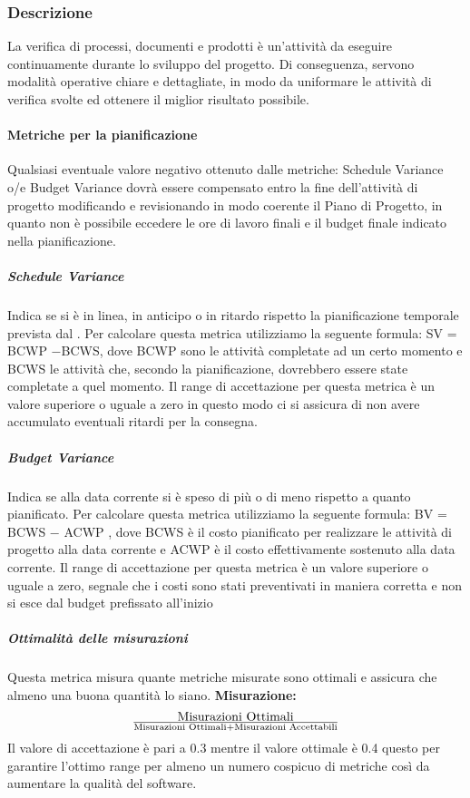 \subsubsection{Descrizione}

La verifica di processi, documenti e prodotti è un'attività da eseguire continuamente
durante lo sviluppo del progetto. Di conseguenza, servono modalità operative chiare
e dettagliate, in modo da uniformare le attività di verifica svolte ed ottenere il miglior
risultato possibile.

\paragraph{Metriche per la pianificazione}
Qualsiasi eventuale valore negativo ottenuto dalle  metriche: Schedule Variance o/e Budget Variance dovrà essere  compensato entro la fine dell'attività di progetto modificando e revisionando in modo coerente il Piano di Progetto, in quanto non è possibile eccedere le ore di lavoro finali e il budget finale indicato nella pianificazione.

\subparagraph{Schedule Variance}
Indica se si è in linea, in anticipo o in ritardo rispetto la pianificazione temporale prevista dal \pianodiprogetto.
Per calcolare questa metrica utilizziamo la seguente formula: SV = BCWP −BCWS, dove BCWP sono le attività completate ad un certo momento e BCWS
le attività che, secondo la pianificazione, dovrebbero essere state completate a quel momento.
Il range di accettazione per questa metrica è un valore superiore o uguale a zero in questo modo ci si assicura di non avere accumulato eventuali ritardi per la consegna.

\subparagraph{Budget Variance}
Indica se alla data corrente si è speso di più o di meno rispetto a quanto pianificato.
Per calcolare questa metrica utilizziamo la seguente formula: BV = BCWS − ACWP , dove BCWS è il costo pianificato per realizzare le attività di progetto
alla data corrente e ACWP è il costo effettivamente sostenuto alla data corrente.
Il range di accettazione per questa metrica è un valore superiore o uguale a zero, segnale che i costi sono stati preventivati in maniera corretta e non si esce dal budget prefissato all'inizio


\subparagraph{Ottimalità delle misurazioni}
Questa metrica misura quante metriche misurate sono ottimali e assicura che almeno una buona quantità lo siano.
\textbf{Misurazione:} 
\begin{displaymath}
{\text{Misurazioni Ottimali}}\over{\text{Misurazioni Ottimali} + \text{Misurazioni Accettabili}}
\end{displaymath} 
Il valore di accettazione è pari a 0.3 mentre il valore ottimale è 0.4 questo per garantire l'ottimo range per almeno un numero cospicuo di metriche così da aumentare la qualità del software.


